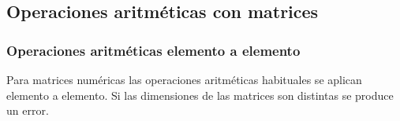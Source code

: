 \documentclass[
  a4paper,
]{scrreport}
\theoremstyle{definition}
\theoremstyle{definition}
\theoremstyle{remark}
\begin{document}
\hypertarget{operaciones-aritmuxe9ticas-con-matrices}{%
\subsection{Operaciones aritméticas con
matrices}\label{operaciones-aritmuxe9ticas-con-matrices}}

\hypertarget{operaciones-aritmuxe9ticas-elemento-a-elemento-1}{%
\subsubsection{Operaciones aritméticas elemento a
elemento}\label{operaciones-aritmuxe9ticas-elemento-a-elemento-1}}

Para matrices numéricas las operaciones aritméticas habituales se
aplican elemento a elemento. Si las dimensiones de las matrices son
distintas se produce un error.
\end{document}
